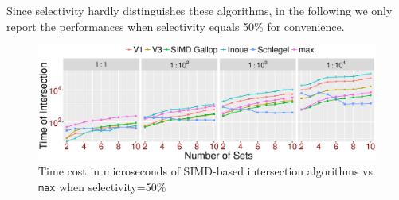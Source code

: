 \documentclass[runningheads,a4paper]{llncs}
\begin{document}
Since selectivity hardly distinguishes these algorithms, in the following we only report the performances when selectivity equals 50\% for convenience.
\begin{figure}
	\centering
	\includegraphics[width=1.0\linewidth]{simd_1}
	\caption{Time cost in microseconds of SIMD-based intersection algorithms vs. \texttt{max} when selectivity=50\%}
	\label{fig: simd_1}
\end{figure}
\end{document}
